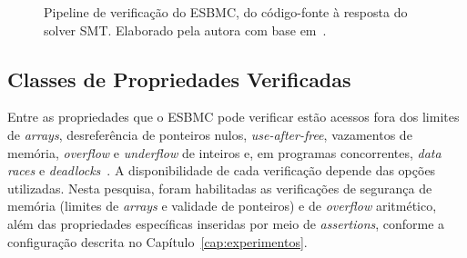 \begin{figure}[ht]
{}
  \caption[Pipeline de verificação do ESBMC]{Pipeline de verificação do ESBMC, do código-fonte à resposta do solver SMT. Elaborado pela autora com base em~\cite{ESBMC_GitHub}.}
  \label{fig:esbmc_pipeline}
\end{figure}

\subsection{Classes de Propriedades Verificadas}

Entre as propriedades que o ESBMC pode verificar estão acessos fora dos limites de \textit{arrays}, desreferência de ponteiros nulos, \textit{use-after-free}, vazamentos de memória, \textit{overflow} e \textit{underflow} de inteiros e, em programas concorrentes, \textit{data races} e \textit{deadlocks}~\cite{Cordeiro2012,ESBMC_GitHub}. A disponibilidade de cada verificação depende das opções utilizadas. Nesta pesquisa, foram habilitadas as verificações de segurança de memória (limites de \textit{arrays} e validade de ponteiros) e de \textit{overflow} aritmético, além das propriedades específicas inseridas por meio de \textit{assertions}, conforme a configuração descrita no Capítulo~\ref{cap:experimentos}.
